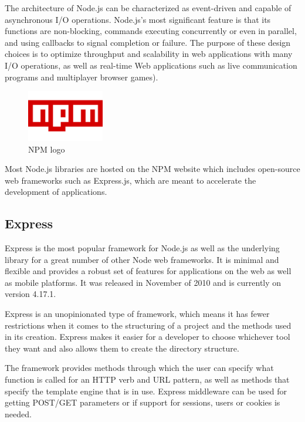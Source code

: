 \documentclass{report}
\begin{document}
The architecture of Node.js can be characterized as event-driven and capable of asynchronous I/O operations. Node.js's most significant feature is that its functions are non-blocking, commands executing concurrently or even in parallel, and using callbacks to signal completion or failure. The purpose of these design choices is to optimize throughput and scalability in web applications with many I/O operations, as well as real-time Web applications such as live communication programs and multiplayer browser games). \par
\begin{figure}
	\vspace*{-1cm}
    \centering
    \includegraphics[width=0.3\textwidth]{npm}
	\caption{NPM logo}
	\vspace{-40pt} 
\end{figure}
Most Node.js libraries are hosted on the NPM website which includes open-source web frameworks such as Express.js, which are meant to accelerate the development of applications. 

\subsection {Express}
Express is the most popular framework for Node.js as well as the underlying library for a great number of other Node web frameworks. It is minimal and flexible and provides a robust set of features for applications on the web as well as mobile platforms. It was released in November of 2010 and is currently on version 4.17.1.\par

Express is an unopinionated type of framework, which means it has fewer restrictions when it comes to the structuring of a project and the methods used in its creation. Express makes it easier for a developer to choose whichever tool they want and also allows them to create the directory structure.\par

The framework provides methods through which the user can specify what function is called for an HTTP verb and URL pattern, as well as methods that specify the template engine that is in use. Express middleware can be used for getting POST/GET parameters or if support for sessions, users or cookies is needed.
\end{document}
